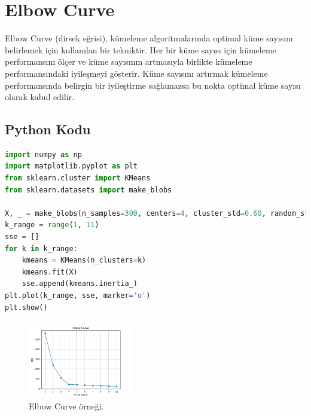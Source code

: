 \section{Elbow Curve}
Elbow Curve (dirsek eğrisi), kümeleme algoritmalarında optimal küme sayısını belirlemek için kullanılan bir tekniktir. Her bir küme sayısı için kümeleme performansını ölçer ve küme sayısının artmasıyla birlikte kümeleme performansındaki iyileşmeyi gösterir. Küme sayısını artırmak kümeleme performansında belirgin bir iyileştirme sağlamazsa bu nokta optimal küme sayısı olarak kabul edilir.

\subsection{Python Kodu}

\begin{lstlisting}[language=Python]
import numpy as np
import matplotlib.pyplot as plt
from sklearn.cluster import KMeans
from sklearn.datasets import make_blobs

X, _ = make_blobs(n_samples=300, centers=4, cluster_std=0.60, random_state=0)
k_range = range(1, 11)
sse = []
for k in k_range:
    kmeans = KMeans(n_clusters=k)
    kmeans.fit(X)
    sse.append(kmeans.inertia_)
plt.plot(k_range, sse, marker='o')
plt.show()
\end{lstlisting}

\begin{figure}[h]
    \centering
    \includegraphics[width=0.4\textwidth]{images/elbow_curve.png}
    \caption{Elbow Curve örneği.}
    \label{fig:enter-label}
\end{figure}

\newpage